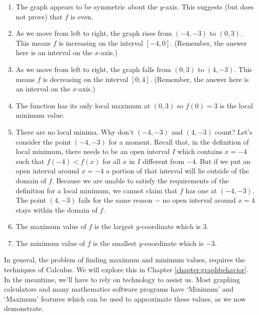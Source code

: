 {\begin{enumerate}


\item  The graph appears to be symmetric about the $y$-axis.  This suggests (but does not prove) that $f$ is even.

\item  As we move from left to right, the graph rises from $(-4,-3)$ to $(0,3)$.  This means $f$ is increasing on the interval $[-4,0]$.  (Remember, the answer here is an interval on the $x$-axis.)

\item  As we move from left to right, the graph falls from $(0,3)$ to $(4,-3)$.  This means $f$ is decreasing on the interval $[0,4]$.  (Remember, the answer here is an interval on the $x$-axis.)

\item  The function has its only local maximum at $(0,3)$ so $f(0) = 3$ is the local minimum value.

\item  There are no local minima.  Why don't $(-4, -3)$ and $(4, -3)$ count?  Let's consider the point $(-4, -3)$ for a moment.  Recall that, in the definition of local minimum, there needs to be an open interval $I$ which contains $x = -4$ such that $f(-4) < f(x)$ for all $x$ in $I$ different from $-4$.  But if we put an open interval around $x= -4$ a portion of that interval will lie outside of the domain of $f$.  Because we are unable to satisfy the requirements of the definition for a local minimum, we cannot claim that $f$ has one at $(-4, -3)$.  The point $(4, -3)$ fails for the same reason $-$ no open interval around $x = 4$ stays within the domain of $f$.

\item  The maximum value of $f$ is the largest $y$-coordinate which is $3$.

\item  The minimum value of $f$ is the smallest $y$-coordinate which is $-3$.
\end{enumerate}}

\medskip

In general, the problem of finding maximum and minimum values, requires the techniques of Calculus. We will explore this in Chapter \ref{chapter:graphbehavior}. In the meantime, we'll have to rely on technology to assist us.  Most graphing calculators and many mathematics software programs have `Minimum' and `Maximum' features which can be used to approximate these values, as we now demonstrate.

